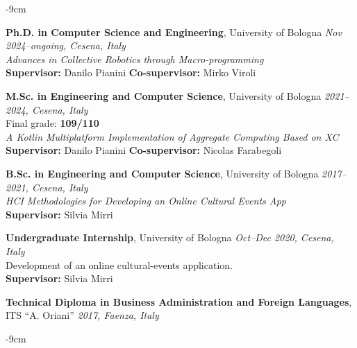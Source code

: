 \documentclass[10pt,a4paper]{altacv}
\begin{document}
    \begin{adjustwidth}{}{-9cm}
    \small

    \textcolor{accent}{\textbf{Ph.D. in Computer Science and Engineering}}, University of Bologna
    \hfill \textit{Nov 2024--ongoing, Cesena, Italy}\\
    \emph{Advances in Collective Robotics through Macro-programming}\\
    \textbf{Supervisor:} Danilo Pianini \quad
    \textbf{Co-supervisor:} Mirko Viroli

    \divider

    \textcolor{accent}{\textbf{M.Sc. in Engineering and Computer Science}}, University of Bologna
    \hfill \textit{2021--2024, Cesena, Italy}\\
    Final grade: \textbf{109/110}\\
    \emph{A Kotlin Multiplatform Implementation of Aggregate Computing Based on XC}\\
    \textbf{Supervisor:} Danilo Pianini \quad
    \textbf{Co-supervisor:} Nicolas Farabegoli

    \divider

    \textcolor{accent}{\textbf{B.Sc. in Engineering and Computer Science}}, University of Bologna
    \hfill \textit{2017--2021, Cesena, Italy}\\
    \emph{HCI Methodologies for Developing an Online Cultural Events App}\\
    \textbf{Supervisor:} Silvia Mirri

    \divider

    \textcolor{accent}{\textbf{Undergraduate Internship}}, University of Bologna
    \hfill \textit{Oct--Dec 2020, Cesena, Italy}\\
    Development of an online cultural-events application.\\
    \textbf{Supervisor:} Silvia Mirri

    \divider

    \textcolor{accent}{\textbf{Technical Diploma in Business Administration and Foreign Languages}},
    ITS ``A. Oriani''
    \hfill \textit{2017, Faenza, Italy}

    \normalsize
    \end{adjustwidth}

    \begin{adjustwidth}{}{-9cm}

    \nocite{*}
    \printbibliography[
        heading=none,
        type=article,
        check=pub
    ]
    \printbibliography[
        heading=none,
        type=article,
        check=notpub
    ]

    \divider

    \printbibliography[
        heading=none,
        type=inproceedings,
        check=pub
    ]
    \printbibliography[
        heading=none,
        type=inproceedings,
        check=notpub
    ]

    \divider
    \end{adjustwidth}
\end{document}

